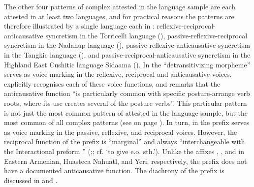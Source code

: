 The other four patterns of complex  attested in the language sample are each attested in at least two languages, and for practical reasons the patterns are therefore illustrated by a single language each in : reflexive-reciprocal-anticausative syncretism in the Torricelli language  (), pas\-sive-re\-flex\-ive-re\-ci\-proc\-al syncretism in the Nadahup language  (), pas\-sive-re\-flex\-ive-anti\-cau\-sative syncretism in the Tangkic language  (), and pas\-sive-re\-ci\-pro\-cal-anti\-cau\-sative syncretism in the Highland East Cushitic language Si\-daa\-ma (). In  the “detransitivizing morpheme”  serves as voice marking in the reflexive, reciprocal and anticausative voices. \cite[369f.]{wilson:2017} explicitly recognises each of these voice functions, and remarks that the anticausative function “is particularly common with specific posture-arrange  verb roots, where its use creates several of the posture verbs”. This particular pattern is not just the most common pattern of  attested in the language sample, but the most common of all complex patterns (see  on page \pageref{tab:ch6:voice-syncretism-maximal-complex-macroarea}). In turn, in  the prefix  serves as voice marking in the passive, reflexive, and reciprocal voices. However, the reciprocal function of the prefix is “marginal” and always “interchangeable with the Interactional preform ” (\citealt[473, 485f.]{epps:2008};; cf.  ‘to give e.o. sth.’). Unlike the affixes , , and  in Eastern Armenian, Huasteca Nahuatl, and Yeri, respectively, the  prefix  does not have a documented anticausative function. The diachrony of the prefix is discussed in  and .

